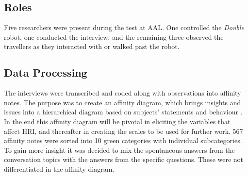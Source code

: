 \subsection{Roles}
Five researchers were present during the test at AAL. One controlled the \textit{Double} robot, one conducted the interview, and the remaining three observed the travellers as they interacted with or walked past the robot. 

\subsection{Data Processing}
The interviews were transcribed and coded along with observations into affinity notes. The purpose was to create an affinity diagram, which brings insights and issues into a hierarchical diagram based on subjects' statements and behaviour \cite{Wendell2005}. In the end this affinity diagram will be pivotal in eliciting the variables that affect HRI, and thereafter in creating the scales to be used for further work. 
567 affinity notes were sorted into 10 green categories with individual subcategories. To gain more insight it was decided to mix the spontaneous answers from the conversation topics with the answers from the specific questions. These were not differentiated in the affinity diagram.




